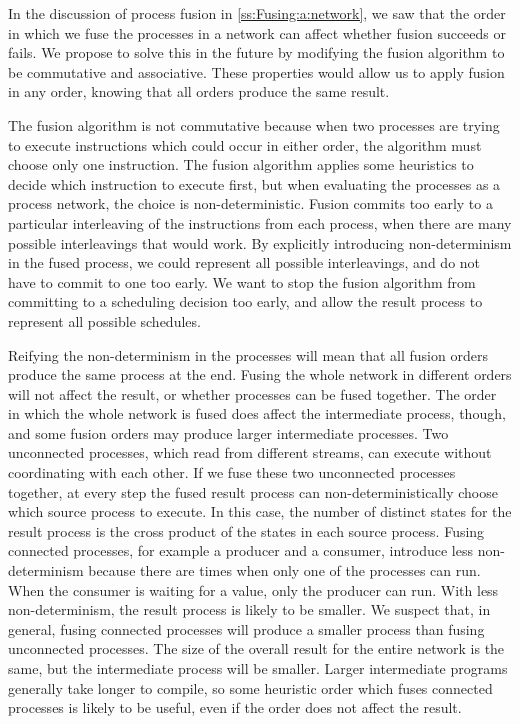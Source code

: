 In the discussion of process fusion in \cref{ss:Fusing:a:network}, we saw that the order in which we fuse the processes in a network can affect whether fusion succeeds or fails.
We propose to solve this in the future by modifying the fusion algorithm to be commutative and associative.
These properties would allow us to apply fusion in any order, knowing that all orders produce the same result.

The fusion algorithm is not commutative because when two processes are trying to execute instructions which could occur in either order, the algorithm must choose only one instruction.
The fusion algorithm applies some heuristics to decide which instruction to execute first, but when evaluating the processes as a process network, the choice is non-deterministic.
Fusion commits too early to a particular interleaving of the instructions from each process, when there are many possible interleavings that would work.
By explicitly introducing non-determinism in the fused process, we could represent all possible interleavings, and do not have to commit to one too early.
We want to stop the fusion algorithm from committing to a scheduling decision too early, and allow the result process to represent all possible schedules.

Reifying the non-determinism in the processes will mean that all fusion orders produce the same process at the end.
Fusing the whole network in different orders will not affect the result, or whether processes can be fused together.
The order in which the whole network is fused does affect the intermediate process, though, and some fusion orders may produce larger intermediate processes.
Two unconnected processes, which read from different streams, can execute without coordinating with each other.
If we fuse these two unconnected processes together, at every step the fused result process can non-deterministically choose which source process to execute.
In this case, the number of distinct states for the result process is the cross product of the states in each source process.
Fusing connected processes, for example a producer and a consumer, introduce less non-determinism because there are times when only one of the processes can run.
When the consumer is waiting for a value, only the producer can run.
With less non-determinism, the result process is likely to be smaller.
We suspect that, in general, fusing connected processes will produce a smaller process than fusing unconnected processes.
The size of the overall result for the entire network is the same, but the intermediate process will be smaller.
Larger intermediate programs generally take longer to compile, so some heuristic order which fuses connected processes is likely to be useful, even if the order does not affect the result.

